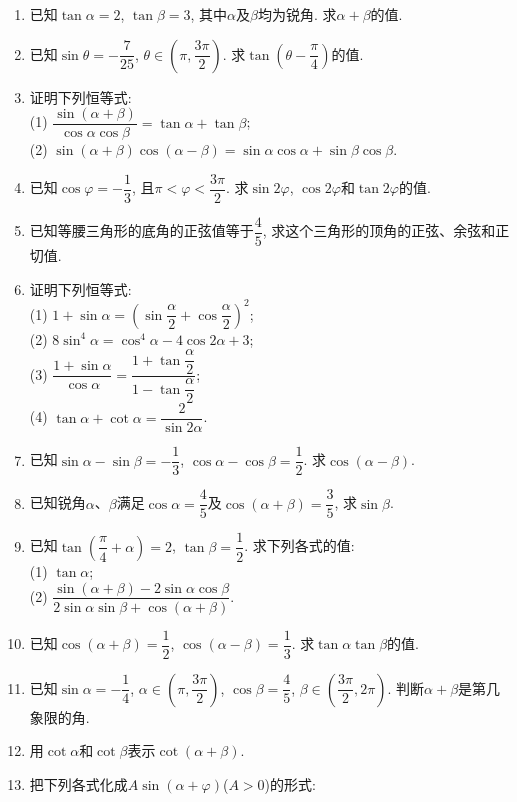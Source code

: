 \documentclass[10pt,a4paper]{article}
\begin{document}
\begin{enumerate}[1.]
\item 已知$\tan \alpha=2$, $\tan \beta=3$, 其中$\alpha$及$\beta$均为锐角. 求$\alpha+\beta$的值.
\item 已知$\sin \theta =-\dfrac 7{25}$, $\theta \in (\pi , \dfrac{3\pi} 2)$. 求$\tan (\theta -\dfrac\pi 4)$的值.
\item 证明下列恒等式:\\
(1) $\dfrac{\sin (\alpha+\beta)}{\cos \alpha\cos \beta}=\tan \alpha+\tan\beta$;\\
(2) $\sin (\alpha+\beta)\cos (\alpha-\beta)=\sin \alpha\cos \alpha+\sin \beta\cos\beta$.
\item 已知$\cos \varphi =-\dfrac 13$, 且$\pi <\varphi <\dfrac{3\pi} 2$. 求$\sin 2\varphi$, $\cos 2\varphi$和$\tan 2\varphi$的值.
\item 已知等腰三角形的底角的正弦值等于$\dfrac 45$, 求这个三角形的顶角的正弦、余弦和正切值.
\item 证明下列恒等式:\\
(1) $1+\sin \alpha=(\sin \dfrac \alpha2+\cos \dfrac\alpha2)^2$;\\
(2) $8\sin^4\alpha=\cos^4\alpha-4\cos 2\alpha+3$;\\
(3) $\dfrac{1+\sin \alpha}{\cos \alpha} =\dfrac{1+\tan \dfrac \alpha2}{1-\tan \dfrac \alpha2}$;\\
(4) $\tan \alpha+\cot \alpha= \dfrac 2{\sin 2\alpha}$.
\item 已知$\sin \alpha-\sin \beta=-\dfrac 13$, $\cos \alpha-\cos \beta=\dfrac 12$. 求$\cos (\alpha-\beta)$.
\item 已知锐角$\alpha$、$\beta$满足$\cos \alpha=\dfrac 45$及$\cos (\alpha+\beta)=\dfrac 35$, 求$\sin \beta$.
\item 已知$\tan (\dfrac \pi 4+\alpha)=2$, $\tan \beta=\dfrac 12$. 求下列各式的值:\\
(1) $\tan \alpha$;\\
(2) $\dfrac{\sin (\alpha+\beta)-2\sin \alpha\cos \beta}{2\sin \alpha\sin \beta+\cos (\alpha+\beta)}$.
\item 已知$\cos (\alpha+\beta)=\dfrac 12$, $\cos (\alpha-\beta)=\dfrac 13$. 求$\tan \alpha\tan \beta$的值.
\item 已知$\sin \alpha=-\dfrac 14$, $\alpha\in (\pi , \dfrac{3\pi} 2)$, $\cos \beta=\dfrac 45$, $\beta\in (\dfrac{3\pi} 2, 2\pi)$. 判断$\alpha+\beta$是第几象限的角.
\item 用$\cot \alpha$和$\cot \beta$表示$\cot (\alpha+\beta)$.
\item 把下列各式化成$A\sin (\alpha+\varphi)$($A>0$)的形式:\\

\end{enumerate}
\end{document}

